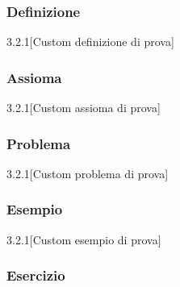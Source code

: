 \subsubsection{Definizione}

\begin{definizione}
\lipsum[4]
\end{definizione}

\begin{definizione-num}{3.2.1}[Custom definizione di prova]
\lipsum[4]
\end{definizione-num}

\subsubsection{Assioma}

\begin{assioma}
\lipsum[4]
\end{assioma}

\begin{assioma-num}{3.2.1}[Custom assioma di prova]
\lipsum[4]
\end{assioma-num}

\subsubsection{Problema}

\begin{problema}
\lipsum[4]
\end{problema}

\begin{problema-num}{3.2.1}[Custom problema di prova]
\lipsum[4]
\end{problema-num}

\subsubsection{Esempio}

\begin{esempio}
\lipsum[4]
\end{esempio}

\begin{esempio-num}{3.2.1}[Custom esempio di prova]
\lipsum[4]
\end{esempio-num}

\subsubsection{Esercizio}


